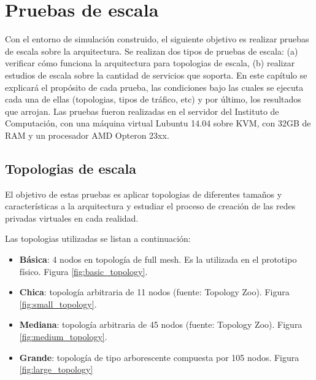 \chapter{Pruebas de escala}

\graphicspath{{Chapter4/Figs/}}

Con el entorno de simulación construido, el siguiente objetivo es realizar pruebas de escala sobre la arquitectura. Se realizan dos tipos de pruebas de escala: (a) verificar cómo funciona la arquitectura para topologias de escala, (b) realizar estudios de escala sobre la cantidad de servicios que soporta. En este capítulo se explicará el propósito de cada prueba, las condiciones bajo las cuales se ejecuta cada una de ellas (topologias, tipos de tráfico, etc) y por último, los resultados que arrojan. Las pruebas fueron realizadas en el servidor del Instituto de Computación, con una máquina virtual Lubuntu 14.04 sobre KVM, con 32GB de RAM y un procesador AMD Opteron 23xx.

\section{Topologias de escala}
El objetivo de estas pruebas es aplicar topologias de diferentes tamaños y características a la arquitectura y estudiar el proceso de creación de las redes privadas virtuales en cada realidad.

Las topologias utilizadas se listan a continuación:
\begin{itemize}
	\item \textbf{Básica}: 4 nodos en topología de full mesh. Es la utilizada en el prototipo físico. Figura \ref{fig:basic_topology}.
	\item \textbf{Chica}: topología arbitraria de 11 nodos (fuente: Topology Zoo). Figura \ref{fig:small_topology}.
	\item \textbf{Mediana}: topología arbitraria de 45 nodos (fuente: Topology Zoo). Figura \ref{fig:medium_topology}.
	\item \textbf{Grande}: topología de tipo arborescente compuesta por 105 nodos. Figura \ref{fig:large_topology}
\end{itemize}

